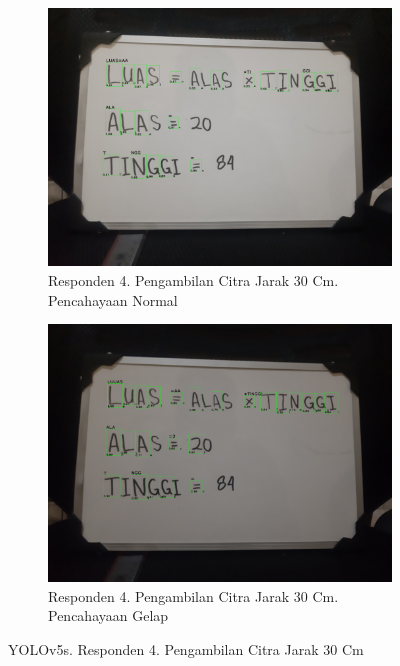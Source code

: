 \begin{figure}[H]
  \begin{subfigure}{.5\textwidth}
    \centering
    \captionsetup{width=.8\linewidth}
    \includegraphics[width=.8\linewidth]{gambar/yolov5s/responden4/hakimaxt30cm00-result.jpg}
    \caption{Responden 4. Pengambilan Citra Jarak 30 Cm. Pencahayaan Normal}
    \label{fig:sr4tcitra30cm}
  \end{subfigure}%
  \begin{subfigure}{.5\textwidth}
    \centering
    \captionsetup{width=.8\linewidth}
    \includegraphics[width=.8\linewidth]{gambar/yolov5s/responden4/hakimaxt30cm10-result.jpg}
    \caption{Responden 4. Pengambilan Citra Jarak 30 Cm. Pencahayaan Gelap}
    \label{fig:sr4gcitra30cm}
  \end{subfigure}
  \caption{YOLOv5s. Responden 4. Pengambilan Citra Jarak 30 Cm}
  \label{fig:sr4citra30cm}
\end{figure}

